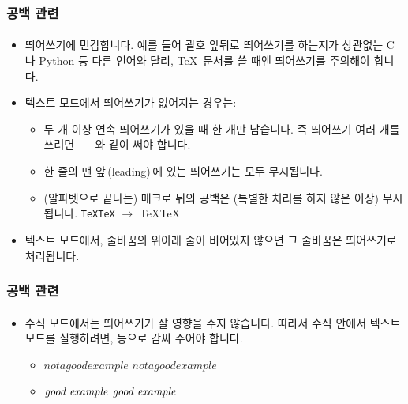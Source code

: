   \begin{frame}[fragile]
    \frametitle{공백 관련}
    \framesubtitle{}
    \begin{itemize}
      \item<1->  띄어쓰기에 민감합니다. 예를 들어 괄호 앞뒤로 띄어쓰기를 하는지가 상관없는 C나 Python 등 다른 언어와 달리, \TeX\ 문서를 쓸 때엔 띄어쓰기를 주의해야 합니다.
      \item<2-> 텍스트 모드에서 띄어쓰기가 없어지는 경우는:
      \begin{itemize}
        \item 두 개 이상 연속 띄어쓰기가 있을 때 한 개만 남습니다. 즉 띄어쓰기 여러 개를 쓰려면 \texttt{\ \ \ }와 같이 써야 합니다.
        \item 한 줄의 맨 앞{\,\small(leading)\normalsize\,}에 있는 띄어쓰기는 모두 무시됩니다.
        \item (알파벳으로 끝나는) 매크로 뒤의 공백은 (특별한 처리를 하지 않은 이상) 무시됩니다. \texttt{\TeX \TeX} $\to$ \TeX \TeX
      \end{itemize}
      \item<3-> 텍스트 모드에서, 줄바꿈의 위아래 줄이 비어있지 않으면 그 줄바꿈은 띄어쓰기로 처리됩니다.
    \end{itemize}
  \end{frame}


  \begin{frame}[fragile]
    \frametitle{공백 관련}
    \framesubtitle{}
    \begin{itemize}
      \item 수식 모드에서는 띄어쓰기가 잘 영향을 주지 않습니다. 따라서 수식 안에서 텍스트 모드를 실행하려면, \texttt{} 등으로 감싸 주어야 합니다.
      \begin{itemize}
        \item \texttt{$not a good example$} $not a good example$
        \item \texttt{$\textrm{\textit{good example}}$} $\textrm{\textit{good example}}$
      \end{itemize}
    \end{itemize}
  \end{frame}
  